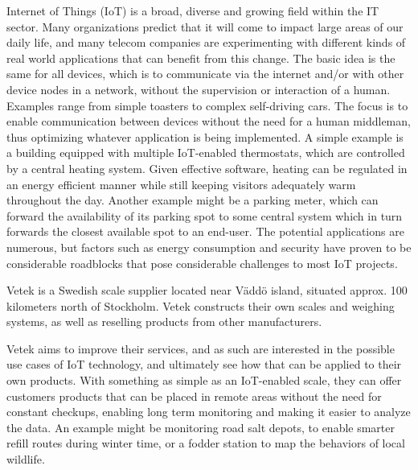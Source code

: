






Internet of Things (IoT) is a broad, diverse and growing field within the IT sector. Many organizations predict that it will come to impact large areas of our daily life, and many telecom companies are experimenting with different kinds of real world applications that can benefit from this change. The basic idea is the same for all devices, which is to communicate via the internet and/or with other device nodes in a network, without the supervision or interaction of a human. Examples range from simple toasters to complex self-driving cars.\cite{what_is_iot} The focus is to enable communication between devices without the need for a human middleman, thus optimizing whatever application is being implemented. A simple example is a building equipped with multiple IoT-enabled thermostats, which are controlled by a central heating system. Given effective software, heating can be regulated in an energy efficient manner while still keeping visitors adequately warm throughout the day. Another example might be a parking meter, which can forward the availability of its parking spot to some central system which in turn forwards the closest available spot to an end-user. The potential applications are numerous, but factors such as energy consumption and security have proven to be considerable roadblocks that pose considerable challenges to most IoT projects.

Vetek is a Swedish scale supplier located near Väddö island, situated approx. 100 kilometers north of Stockholm. Vetek constructs their own scales and weighing systems, as well as reselling products from other manufacturers.\cite{vetek} 

Vetek aims to improve their services, and as such are interested in the possible use cases of IoT technology, and ultimately see how that can be applied to their own products. With something as simple as an IoT-enabled scale, they can offer customers products that can be placed in remote areas without the need for constant checkups, enabling long term monitoring and making it easier to analyze the data. An example might be monitoring road salt depots, to enable smarter refill routes during winter time, or a fodder station to map the behaviors of local wildlife.

